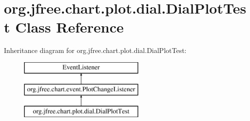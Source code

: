 \hypertarget{classorg_1_1jfree_1_1chart_1_1plot_1_1dial_1_1_dial_plot_test}{}\section{org.\+jfree.\+chart.\+plot.\+dial.\+Dial\+Plot\+Test Class Reference}
\label{classorg_1_1jfree_1_1chart_1_1plot_1_1dial_1_1_dial_plot_test}
Inheritance diagram for org.\+jfree.\+chart.\+plot.\+dial.\+Dial\+Plot\+Test\+:\begin{figure}[H]
\begin{center}
\leavevmode
\includegraphics[height=3.000000cm]{classorg_1_1jfree_1_1chart_1_1plot_1_1dial_1_1_dial_plot_test}
\end{center}
\end{figure}
